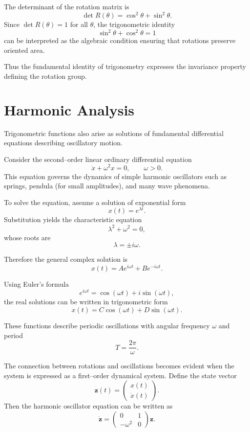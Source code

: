 \documentclass[11pt, openany]{book}
\theoremstyle{plain}
\theoremstyle{definition}
\theoremstyle{remark}
\begin{document}
The determinant of the rotation matrix is
\[
\det R(\theta)
=
\cos^2\theta+\sin^2\theta.
\]
Since $\det R(\theta)=1$ for all $\theta$, the trigonometric identity
\[
\sin^2\theta+\cos^2\theta=1
\]
can be interpreted as the algebraic condition ensuring that rotations
preserve oriented area.

Thus the fundamental identity of trigonometry expresses the invariance
property defining the rotation group.

\section{Harmonic Analysis}

Trigonometric functions also arise as solutions of fundamental
differential equations describing oscillatory motion.

Consider the second–order linear ordinary differential equation
\[
\ddot{x}+\omega^2 x=0,
\qquad \omega>0.
\]
This equation governs the dynamics of simple harmonic oscillators such
as springs, pendula (for small amplitudes), and many wave phenomena.

To solve the equation, assume a solution of exponential form
\[
x(t)=e^{\lambda t}.
\]
Substitution yields the characteristic equation
\[
\lambda^2+\omega^2=0,
\]
whose roots are
\[
\lambda=\pm i\omega.
\]

Therefore the general complex solution is
\[
x(t)=A e^{i\omega t}+B e^{-i\omega t}.
\]

Using Euler's formula
\[
e^{i\omega t}=\cos(\omega t)+i\sin(\omega t),
\]
the real solutions can be written in trigonometric form
\[
x(t)=C\cos(\omega t)+D\sin(\omega t).
\]

These functions describe periodic oscillations with angular frequency
$\omega$ and period
\[
T=\frac{2\pi}{\omega}.
\]

\medskip

The connection between rotations and oscillations becomes evident when
the system is expressed as a first–order dynamical system.  Define the
state vector
\[
\mathbf{z}(t)=
\begin{pmatrix}
x(t) \\
\dot{x}(t)
\end{pmatrix}.
\]
Then the harmonic oscillator equation can be written as
\[
\dot{\mathbf{z}}=
\begin{pmatrix}
0 & 1 \\
-\omega^2 & 0
\end{pmatrix}
\mathbf{z}.
\]
\end{document}
